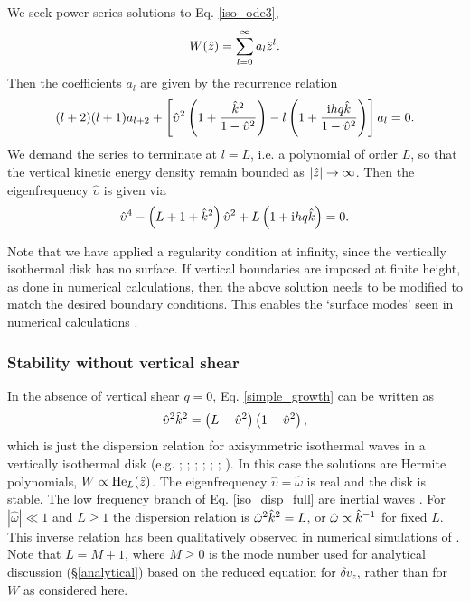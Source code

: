 We seek power series solutions to Eq. \ref{iso_ode3}, 
\begin{align}
  W(\hat{z}) = \sum_{l=0}^\infty a_l\hat{z}^l. 
\end{align}
Then the coefficients $a_l$ are given by the recurrence relation
\begin{align}
  (l+2)(l+1)a_{l+2} +
  \left[\hat{\upsilon}^2\left(1+\frac{\hat{k}^2}{1-\hat{\upsilon}^2}\right)
    - l\left(1+\frac{\mathrm{i} h q
        \hat{k}}{1-\hat{\upsilon}^2}\right)\right] a_l = 0. 
\end{align}
We demand the series to terminate  at $l=L$, i.e. a polynomial of
order $L$, so that the vertical kinetic energy density remain bounded as 
$|\hat{z}|\to\infty$.  Then the eigenfrequency $\hat{\upsilon}$ is given via 
\begin{align}
\hat{\upsilon}^4 - \left(L+1+\hat{k}^2\right)\hat{\upsilon}^2 + L\left(1 +
  \mathrm{i} h q \hat{k}\right) = 0. \label{simple_growth}
\end{align}

Note that we have applied a regularity condition at infinity, since
the vertically isothermal disk has no surface. If vertical boundaries
are imposed at finite height, as done in numerical calculations, then
the above solution needs to be modified to match the desired boundary
conditions. This enables the `surface modes' seen in numerical
calculations . 

\subsubsection{Stability without vertical shear}\label{stable_novshear}
In the absence of vertical shear $q=0$, Eq. \ref{simple_growth} can be
written as \begin{align}
  \hat{\upsilon}^2\hat{k}^2 =
  \left(L-\hat{\upsilon}^2\right)\left(1-\hat{\upsilon}^2\right), \label{iso_disp_full}
\end{align}
which is just the dispersion relation for axisymmetric isothermal waves in a
vertically isothermal disk (e.g. \citealt{okazaki87}; \citealt{takeuchi98}; \citealt{tanaka02}; 
\citealt{zhang06}; \citealt{ogilvie13}; \citealt{barker14}; ). In 
this case the solutions are Hermite polynomials, $W\propto
\operatorname{He}_L(\hat{z})$.  The eigenfrequency $\hat{\upsilon} = \hat{\omega}$ is real and the disk
is stable. The low frequency branch of Eq. \ref{iso_disp_full} are 
inertial waves \citep{balbus03}. For 
$|\hat{\omega}|\ll 1$ and $L\geq 1$ the dispersion relation is
$\hat{\omega}^2\hat{k}^2 = L$, or $\hat{\omega}\propto \hat{k}^{-1}$ for
fixed $L$. This inverse relation has been qualitatively
observed in numerical simulations of \cite{stoll14}. 
Note that $L=M+1$, where $M\geq 0$ is the mode number used for analytical
discussion (\S\ref{analytical}) based on the reduced equation for
$\delta v_z$, rather than for $W$ as considered here. 

